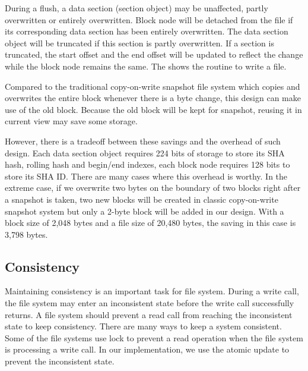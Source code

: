     During a flush, a data section (section object) may be unaffected, partly overwritten or entirely overwritten. Block node will be detached from the file if its corresponding data section has been entirely overwritten. The data section object will be truncated if this section is partly overwritten. If a section is truncated, the start offset and the end offset will be updated to reflect the change while the block node remains the same. The  shows the routine to write a file.

    Compared to the traditional copy-on-write snapshot file system which copies and overwrites the entire block whenever there is a byte change, this design can make use of the old block. Because the old block will be kept for snapshot, reusing it in current view may save some storage.

    However, there is a tradeoff between these savings and the overhead of such design. Each data section object requires 224 bits of storage to store its SHA hash, rolling hash and begin/end indexes, each block node requires 128 bits to store its SHA ID. There are many cases where this overhead is worthy. In the extreme case, if we overwrite two bytes on the boundary of two blocks right after a snapshot is taken, two new blocks will be created in classic copy-on-write snapshot system but only a 2-byte block will be added in our design. With a block size of 2,048 bytes and a file size of 20,480 bytes, the saving in this case is 3,798 bytes.

\subsection{Consistency}

    Maintaining consistency is an important task for file system. During a write call, the file system may enter an inconsistent state before the write call successfully returns. A file system should prevent a read call from reaching the inconsistent state to keep consistency. There are many ways to keep a system consistent. Some of the file systems use lock to prevent a read operation when the file system is processing a write call. In our implementation, we use the atomic update to prevent the inconsistent state.

